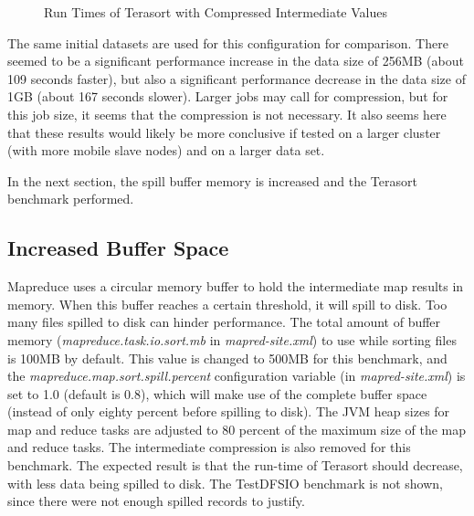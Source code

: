 \documentclass[10pt,journal,compsoc,float]{IEEEtran}
\begin{document}
\begin{figure}[H]
	\centering
	\caption{Run Times of Terasort with Compressed Intermediate Values}
	\label{fig:TerasortCompressed}
\end{figure}

The same initial datasets are used for this configuration for comparison. There seemed to be a significant performance increase in the data size of 256MB (about 109 seconds faster), but also a significant performance decrease in the data size of 1GB (about 167 seconds slower). Larger jobs may call for compression, but for this job size, it seems that the compression is not necessary. It also seems here that these results would likely be more conclusive if tested on a larger cluster (with more mobile slave nodes) and on a larger data set.

In the next section, the spill buffer memory is increased and the Terasort benchmark performed.

\subsection{Increased Buffer Space}
\label{sec:results_spill}

Mapreduce uses a circular memory buffer to hold the intermediate map results in memory. When this buffer reaches a certain threshold, it will spill to disk. Too many files spilled to disk can hinder performance. The total amount of buffer memory (\textit{mapreduce.task.io.sort.mb} in \textit{mapred-site.xml}) to use while sorting files is 100MB by default. This value is changed to 500MB for this benchmark, and the \textit{mapreduce.map.sort.spill.percent} configuration variable (in \textit{mapred-site.xml}) is set to 1.0 (default is 0.8), which will make use of the complete buffer space (instead of only eighty percent before spilling to disk). The JVM heap sizes for map and reduce tasks are adjusted to 80 percent of the maximum size of the map and reduce tasks. The intermediate compression is also removed for this benchmark. The expected result is that the run-time of Terasort should decrease, with less data being spilled to disk. The TestDFSIO benchmark is not shown, since there were not enough spilled records to justify.
\end{document}
